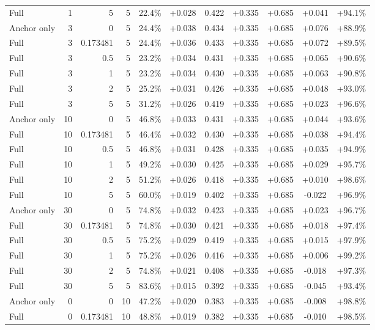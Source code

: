 \begin{table}[htbp]
\begin{tabular}{lrrrccccccc}
Full & 1 & 5 & 5 & 22.4\% & +0.028 & 0.422 & +0.335 & +0.685 & +0.041 & +94.1\% \\
Anchor only & 3 & 0 & 5 & 24.4\% & +0.038 & 0.434 & +0.335 & +0.685 & +0.076 & +88.9\% \\
Full & 3 & 0.173481 & 5 & 24.4\% & +0.036 & 0.433 & +0.335 & +0.685 & +0.072 & +89.5\% \\
Full & 3 & 0.5 & 5 & 23.2\% & +0.034 & 0.431 & +0.335 & +0.685 & +0.065 & +90.6\% \\
Full & 3 & 1 & 5 & 23.2\% & +0.034 & 0.430 & +0.335 & +0.685 & +0.063 & +90.8\% \\
Full & 3 & 2 & 5 & 25.2\% & +0.031 & 0.426 & +0.335 & +0.685 & +0.048 & +93.0\% \\
Full & 3 & 5 & 5 & 31.2\% & +0.026 & 0.419 & +0.335 & +0.685 & +0.023 & +96.6\% \\
Anchor only & 10 & 0 & 5 & 46.8\% & +0.033 & 0.431 & +0.335 & +0.685 & +0.044 & +93.6\% \\
Full & 10 & 0.173481 & 5 & 46.4\% & +0.032 & 0.430 & +0.335 & +0.685 & +0.038 & +94.4\% \\
Full & 10 & 0.5 & 5 & 46.8\% & +0.031 & 0.428 & +0.335 & +0.685 & +0.035 & +94.9\% \\
Full & 10 & 1 & 5 & 49.2\% & +0.030 & 0.425 & +0.335 & +0.685 & +0.029 & +95.7\% \\
Full & 10 & 2 & 5 & 51.2\% & +0.026 & 0.418 & +0.335 & +0.685 & +0.010 & +98.6\% \\
Full & 10 & 5 & 5 & 60.0\% & +0.019 & 0.402 & +0.335 & +0.685 & -0.022 & +96.9\% \\
Anchor only & 30 & 0 & 5 & 74.8\% & +0.032 & 0.423 & +0.335 & +0.685 & +0.023 & +96.7\% \\
Full & 30 & 0.173481 & 5 & 74.8\% & +0.030 & 0.421 & +0.335 & +0.685 & +0.018 & +97.4\% \\
Full & 30 & 0.5 & 5 & 75.2\% & +0.029 & 0.419 & +0.335 & +0.685 & +0.015 & +97.9\% \\
Full & 30 & 1 & 5 & 75.2\% & +0.026 & 0.416 & +0.335 & +0.685 & +0.006 & +99.2\% \\
Full & 30 & 2 & 5 & 74.8\% & +0.021 & 0.408 & +0.335 & +0.685 & -0.018 & +97.3\% \\
Full & 30 & 5 & 5 & 83.6\% & +0.015 & 0.392 & +0.335 & +0.685 & -0.045 & +93.4\% \\
Anchor only & 0 & 0 & 10 & 47.2\% & +0.020 & 0.383 & +0.335 & +0.685 & -0.008 & +98.8\% \\
Full & 0 & 0.173481 & 10 & 48.8\% & +0.019 & 0.382 & +0.335 & +0.685 & -0.010 & +98.5\% \\

\end{tabular}
\end{table}
